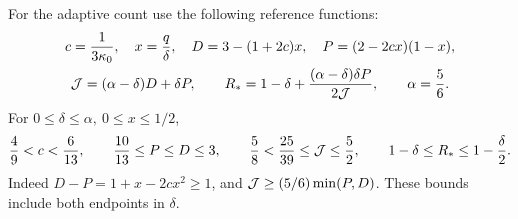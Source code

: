 \documentclass[12pt]{article}
\begin{document}
For the adaptive count use the following reference functions:
\begin{equation}\label{eq:adaptive-functions}
\begin{gathered}
 c=\frac1{3\kappa_0},\quad x=\frac q\delta,\quad
 D=3-(1+2c)x,\quad P=(2-2cx)(1-x),\\
 {\cal J}=(\alpha-\delta)D+\delta P,\qquad
 R_*=1-\delta+\frac{(\alpha-\delta)\delta P}{2{\cal J}},
 \qquad \alpha=\frac56 .
\end{gathered}
\end{equation}
For \(0\le\delta\le\alpha,\ 0\le x\le1/2\),
\[
 \frac49<c<\frac6{13},\qquad
 \frac{10}{13}\le P\le D\le3,\qquad
 \frac58<\frac{25}{39}\le{\cal J}\le\frac52,\qquad
 1-\delta\le R_*\le1-\frac\delta2.
\]
Indeed \(D-P=1+x-2cx^2\ge1\), and
\({\cal J}\ge(5/6)\min(P,D)\).
These bounds include both endpoints in \(\delta\).
\end{document}
